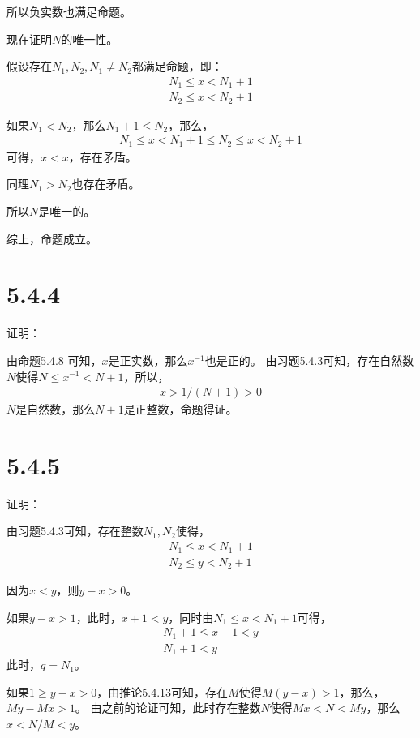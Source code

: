 \documentclass{article}
\theoremstyle{mystyle}
\begin{document}
所以负实数也满足命题。

现在证明$N$的唯一性。

假设存在$N_1,N_2,N_1 \neq N_2$都满足命题，即：
\begin{align*}
  N_1 \leq x < N_1 + 1 \\
  N_2 \leq x < N_2 + 1
\end{align*}

如果$N_1 < N_2$，那么$N_1 + 1 \leq N_2$，那么，
\begin{align*}
  N_1 \leq x < N_1 + 1 \leq N_2 \leq x < N_2+1
\end{align*}
可得，$x < x$，存在矛盾。

同理$N_1 > N_2$也存在矛盾。

所以$N$是唯一的。

综上，命题成立。

\section*{5.4.4}

证明：

由命题5.4.8 可知，$x$是正实数，那么$x^{-1}$也是正的。
由习题5.4.3可知，存在自然数$N$使得$N \leq x^{-1} < N + 1$，所以，
\begin{align*}
  x > 1 / (N + 1) > 0
\end{align*}
$N$是自然数，那么$N + 1$是正整数，命题得证。

\section*{5.4.5}

证明：

由习题5.4.3可知，存在整数$N_1, N_2$使得，
\begin{align*}
  N_1 \leq x < N_1 + 1 \\
  N_2 \leq y < N_2 + 1
\end{align*}

因为$x < y$，则$y - x > 0$。

如果$y - x > 1$，此时，$ x + 1 < y $，同时由$N_1 \leq x < N_1 + 1$可得，
\begin{align*}
  N_1 + 1 \leq x + 1 < y \\
  N_1 + 1 < y
\end{align*}
此时，$q = N_1$。

如果$1 \geq y - x > 0$，由推论5.4.13可知，存在$M$使得$M(y-x) > 1$，那么，$My - Mx > 1$。
由之前的论证可知，此时存在整数$N$使得$Mx < N < My$，那么$x < N/M < y$。
\end{document}

